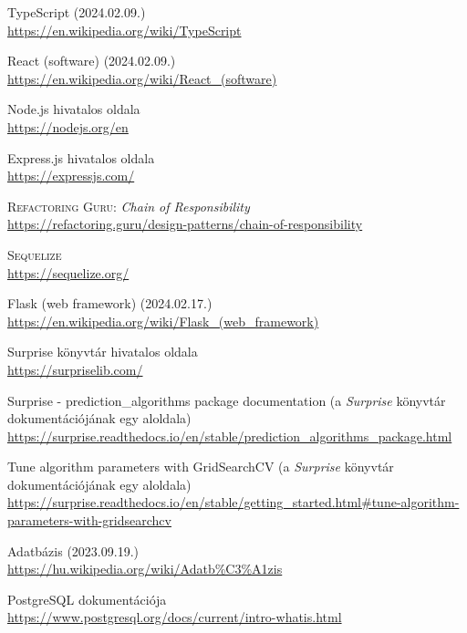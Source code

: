 \documentclass[
]{thesis-ekf}
\theoremstyle{definition}
\theoremstyle{remark}
\begin{document}
\begin{thebibliography}{2}

TypeScript (2024.02.09.)
\\\url{https://en.wikipedia.org/wiki/TypeScript}

React (software) (2024.02.09.)
\\\url{https://en.wikipedia.org/wiki/React_(software)}

Node.js hivatalos oldala
\\\url{https://nodejs.org/en}

Express.js hivatalos oldala
\\\url{https://expressjs.com/}

\textsc{Refactoring Guru}: \emph{Chain of Responsibility} 
\\\url{https://refactoring.guru/design-patterns/chain-of-responsibility}

\textsc{Sequelize} 
\\\url{https://sequelize.org/}

Flask (web framework) (2024.02.17.)
\\\url{https://en.wikipedia.org/wiki/Flask_(web_framework)}

Surprise könyvtár hivatalos oldala
\\\url{https://surpriselib.com/}

Surprise - prediction\_algorithms package documentation (a \emph{Surprise} könyvtár dokumentációjának egy aloldala) 
\\\url{https://surprise.readthedocs.io/en/stable/prediction_algorithms_package.html}

Tune algorithm parameters with GridSearchCV (a \emph{Surprise} könyvtár  dokumentációjának egy aloldala)
\\\url{https://surprise.readthedocs.io/en/stable/getting_started.html#tune-algorithm-parameters-with-gridsearchcv}

Adatbázis (2023.09.19.)
\\\url{https://hu.wikipedia.org/wiki/Adatb%C3%A1zis}

PostgreSQL dokumentációja
\\\url{https://www.postgresql.org/docs/current/intro-whatis.html}


\end{thebibliography}
\end{document}
